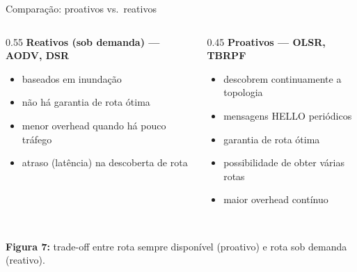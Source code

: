 \documentclass[aspectratio=169,11pt]{beamer}
\begin{document}
\begin{frame}{Comparação: proativos vs.\ reativos}
  \begin{columns}
    \begin{column}{0.55\textwidth}
      \textbf{Reativos (sob demanda) --- AODV, DSR}
      \begin{itemize}
        \item baseados em inundação
        \item não há garantia de rota ótima
        \item menor overhead quando há pouco tráfego
        \item atraso (latência) na descoberta de rota
      \end{itemize}
    \end{column}
    \begin{column}{0.45\textwidth}
      \textbf{Proativos --- OLSR, TBRPF}
      \begin{itemize}
        \item descobrem continuamente a topologia
        \item mensagens HELLO periódicos
        \item garantia de rota ótima
        \item possibilidade de obter várias rotas
        \item maior overhead contínuo
      \end{itemize}
    \end{column}
  \end{columns}
  \begin{center}
    \\[1mm]
    {\scriptsize \textbf{Figura 7:} trade-off entre rota sempre disponível (proativo) e rota sob demanda (reativo).}
  \end{center}
\end{frame}
\end{document}
